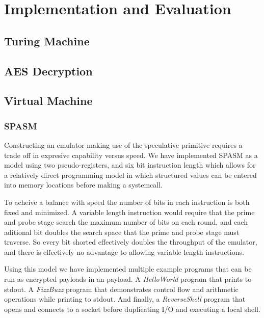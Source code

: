 
\section{Implementation and Evaluation}

\subsection{Turing Machine}



\subsection{AES Decryption}

%

\subsection{Virtual Machine}


\subsubsection{SPASM}
\label{subsubsec:spasm}
Constructing an emulator making use of the speculative primitive requires  
a trade off in expresive capability versus speed. 
We have implemented SPASM as a model using two pseudo-registers, and six 
bit instruction length which allows for a relatively direct programming model 
in which structured values can be entered into memory locations before making 
a systemcall.

To acheive a balance with speed the number of bits in each instruction is both 
fixed and minimized.  A variable length instruction would require that the prime
and probe stage search the maximum number of bits on each round, and each 
aditional bit doubles the search space that the prime and probe stage must 
traverse.  So every bit shorted effectively doubles the throughput of the 
emulator, and there is effectively no advantage to allowing variable length 
instructions. 

Using this model we have implemented multiple example programs that can be run
as encrypted payloads in an \speculake payload. A \textit{HelloWorld} program 
that prints to stdout. A \textit{FizzBuzz} program that demonstrates control 
flow and arithmetic operations while printing to stdout. And finally,
a \textit{ReverseShell} program that opens and connects to a socket before  
duplicating I/O and executing a local shell. 

